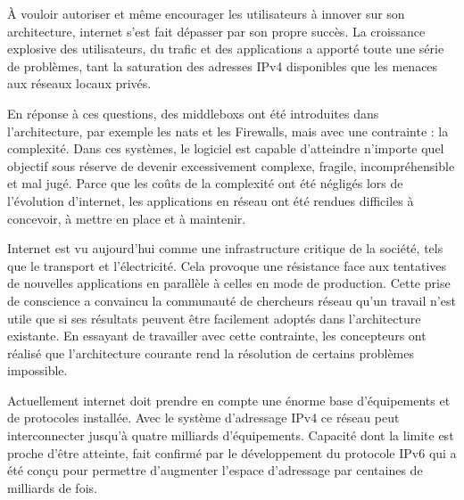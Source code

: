 À vouloir autoriser et même encourager les utilisateurs à innover sur son architecture, internet s'est fait dépasser par son propre succès. La croissance explosive des utilisateurs, du trafic et des applications a apporté toute une série de problèmes, 
tant la saturation des adresses IPv4 disponibles que les menaces aux réseaux locaux privés. 

\par
En réponse à ces questions, des \glspl{middlebox} ont été introduites dans l'architecture, par exemple les \glspl{nat} et les Firewalls, mais avec une contrainte : la complexité. Dans ces systèmes, le logiciel est capable d'atteindre n'importe quel objectif sous réserve de devenir excessivement complexe, fragile, incompréhensible et mal jugé. Parce que les coûts de la complexité ont été négligés lors de l'évolution d'internet, les applications en réseau ont été rendues difficiles à concevoir, à mettre en place et à maintenir. \cite{InternetEvolutionRoleSoftwareEngineeringRealInternet}

Internet est vu aujourd'hui comme une infrastructure critique de la société, tels que le transport et l'électricité.  Cela provoque une résistance face aux tentatives de nouvelles applications en parallèle à celles en mode de production. 
Cette prise de conscience a convaincu la communauté de chercheurs réseau qu'un travail n'est utile que si ses résultats peuvent être facilement adoptés dans l'architecture existante. 
En essayant de travailler avec cette contrainte, les concepteurs ont réalisé que l'architecture courante rend la résolution de certains problèmes impossible. \cite{OpenFlowStanfordOssification} \cite{SurveySDNIntro}

Actuellement internet doit prendre en compte une énorme base d'équipements et de protocoles installée. Avec le système d'adressage IPv4 ce réseau peut interconnecter jusqu'à quatre milliards d'équipements. Capacité dont la limite est proche d'être atteinte, fait confirmé par le développement du protocole IPv6 qui a été conçu pour permettre d'augmenter l'espace d'adressage par centaines de milliards de fois. \cite{ICANNIPv6Important} 


